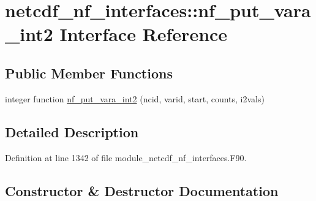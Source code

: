 \hypertarget{interfacenetcdf__nf__interfaces_1_1nf__put__vara__int2}{}\section{netcdf\+\_\+nf\+\_\+interfaces\+:\+:nf\+\_\+put\+\_\+vara\+\_\+int2 Interface Reference}
\label{interfacenetcdf__nf__interfaces_1_1nf__put__vara__int2}
\subsection*{Public Member Functions}
\begin{DoxyCompactItemize}
\item 
integer function \hyperlink{interfacenetcdf__nf__interfaces_1_1nf__put__vara__int2_a80dd00280bda2974af09d937940df65f}{nf\+\_\+put\+\_\+vara\+\_\+int2} (ncid, varid, start, counts, i2vals)
\end{DoxyCompactItemize}


\subsection{Detailed Description}


Definition at line 1342 of file module\+\_\+netcdf\+\_\+nf\+\_\+interfaces.\+F90.



\subsection{Constructor \& Destructor Documentation}
\mbox{\label{interfacenetcdf__nf__interfaces_1_1nf__put__vara__int2_a80dd00280bda2974af09d937940df65f}} 
